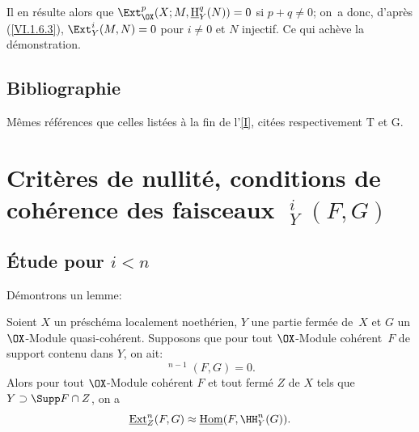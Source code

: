 Il en r\'esulte alors que $\Ext_{\OX}^p(X;M, \mathop{\underline{\mathrm{H}}}\nolimits_Y^q(N))=0$ si $p+q \neq 0$; on~a donc, d'apr\`es (\ref{VI.1.6.3}), $\Ext_Y^i(M, N)=0$ pour $i\neq 0$ et $N$ injectif. Ce qui ach\`eve la d\'emonstration.

\section*{Bibliographie} M\^emes r\'ef\'erences que celles list\'ees \`a la fin de l'\Exp \ref{I}, cit\'ees respectivement T et G.

\chapter[Crit\`eres de nullit\'e, conditions de coh\'erence]
{Crit\`eres de nullit\'e, conditions de coh\'erence des faisceaux $\mathop{\underline{\mathrm{Ext}}}\nolimits^{i}_{Y}(F, G)$}\label{VII}

\renewcommand{\theequation}{\thesection.\arabic{equation}}

\section{\'Etude pour $i < n$}

D\'emontrons un lemme:

\begin{lemme} \label{VII.1.1}
Soient $X$ un pr\'esch\'ema localement noeth\'erien, $Y$ une partie ferm\'ee de~$X$ et $G$ un $\OX$-Module quasi-coh\'erent. Supposons que pour tout $\OX$-Module coh\'erent~$F$ de support contenu dans $Y$, on ait:
\[
\mathop{\underline{\mathrm{Ext}}}\nolimits^{n-1}(F, G) = 0.
\]
Alors pour tout $\OX$-Module coh\'erent $F$ et tout ferm\'e $Z$ de $X$ tels que $Y \supset \Supp F \cap Z$, on a
\[
\mathop{\underline{\mathrm{Ext}}}\nolimits^n_Z(F, G) \approx \mathop{\underline{\mathrm{Hom}}}\nolimits (F, \HH^n_Y(G)).
\]
\end{lemme}

